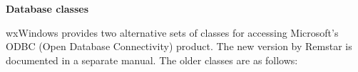 {\large {\bf Database classes}}


wxWindows provides two alternative sets of classes for accessing Microsoft's ODBC (Open Database Connectivity)
product. The new version by Remstar is documented in a separate manual.
The older classes are as follows:

\begin{twocollist}\itemsep=0pt
\end{twocollist}

